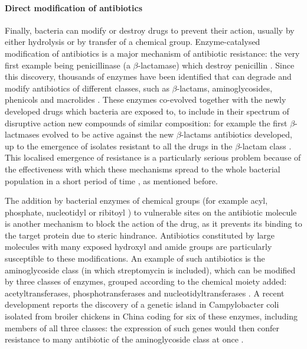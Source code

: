 \paragraph{Direct modification of antibiotics}
Finally, bacteria can modify or destroy drugs to prevent their action, usually by either hydrolysis or by transfer of a chemical group.
%
Enzyme-catalysed modification of antibiotics is a major mechanism of antibiotic resistance: the very first example being penicillinase (a $\beta$-lactamase) which destroy penicillin \cite{Abraham1988}.
%
Since this discovery, thousands of enzymes have been identified that can degrade and modify antibiotics of different classes, such as $\beta$-lactams, aminoglycosides, phenicols and macrolides \cite{Livermore2008,Nordmann2011,Voulgari2013,Woodford2011}.
%
These enzymes co-evolved together with the newly developed drugs which bacteria are exposed to, to include in their spectrum of disruptive action new compounds of similar composition: for example the first $\beta$-lactmases evolved to be active against the new $\beta$-lactams antibiotics developed, up to the emergence of isolates resistant to all the drugs in the $\beta$-lactam class \cite{Woodford2013}.
%
This localised emergence of resistance is a particularly serious problem because of the effectiveness with which these mechanisms spread to the whole bacterial population in a short period of time \cite{Voulgari2013,Woodford2013,Lynch2013}, as mentioned before.
%

The addition by bacterial enzymes of chemical groups (for example acyl, phosphate, nucleotidyl or ribitoyl \cite{Wright2005}) to vulnerable sites on the antibiotic molecule is another mechanism to block the action of the drug, as it prevents its binding to the target protein due to steric hindrance.
%
Antibiotics constituted by large molecules with many exposed hydroxyl and amide groups are particularly susceptible to these modifications. An example of such antibiotics is the aminoglycoside class (in which streptomycin is included), which can be modified by three classes of enzymes, grouped according to the chemical moiety added: acetyltransferases, phosphotransferases and nucleotidyltransferases \cite{Norris2013}.
%
A recent development reports the discovery of a genetic island in Campylobacter coli isolated from broiler chickens in China coding for six of these enzymes, including members of all three classes: the expression of such genes would then confer resistance to many antibiotic of the aminoglycoside class at once \cite{Qin2012}.

